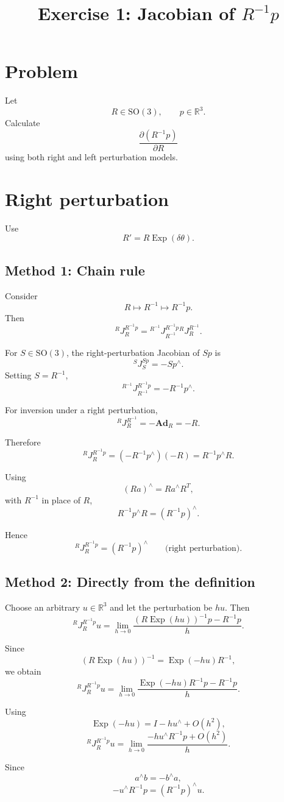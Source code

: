 \documentclass[11pt]{article}
\title{Exercise 1: Jacobian of $R^{-1}p$}
\author{}
\date{}
\newcommand{\Exp}{\operatorname{Exp}}
\newcommand{\SO}{\mathrm{SO}}
\newcommand{\Ad}{\mathbf{Ad}}
\newcommand{\R}{\mathbb{R}}
\begin{document}
\section*{Problem}
Let
\[
R\in\SO(3),\qquad p\in\R^3.
\]
Calculate
\[
\boxed{\frac{\partial(R^{-1}p)}{\partial R}}
\]
using both right and left perturbation models.
\section{Right perturbation}

Use
\[
R'=R\Exp(\delta\theta).
\]

\subsection{Method 1: Chain rule}

Consider
\[
R\longmapsto R^{-1}\longmapsto R^{-1}p.
\]
Then
\[
{}^{R}J_R^{R^{-1}p}
=
{}^{R^{-1}}J_{R^{-1}}^{R^{-1}p}{}^{R}J_R^{R^{-1}}.
\]

For $S\in\SO(3)$, the right-perturbation Jacobian of $Sp$ is
\[
{}^{S}J_S^{Sp}=-Sp^\wedge.
\]
Setting $S=R^{-1}$,
\[
{}^{R^{-1}}J_{R^{-1}}^{R^{-1}p}=-R^{-1}p^\wedge.
\]

For inversion under a right perturbation,
\[
{}^{R}J_R^{R^{-1}}=-\Ad_R=-R.
\]

Therefore
\[
{}^{R}J_R^{R^{-1}p}
=(-R^{-1}p^\wedge)(-R)
=R^{-1}p^\wedge R.
\]

Using
\[
(Ra)^\wedge=Ra^\wedge R^T,
\]
with $R^{-1}$ in place of $R$,
\[
R^{-1}p^\wedge R=(R^{-1}p)^\wedge.
\]

Hence
\[
\boxed{
{}^{R}J_R^{R^{-1}p}=(R^{-1}p)^\wedge
\qquad\text{(right perturbation)}.
}
\]

\subsection{Method 2: Directly from the definition}

Choose an arbitrary $u\in\R^3$ and let the perturbation be $hu$.
Then
\[
{}^{R}J_R^{R^{-1}p}u
=
\lim_{h\to0}
\frac{
(R\Exp(hu))^{-1}p-R^{-1}p
}{h}.
\]

Since
\[
(R\Exp(hu))^{-1}
=
\Exp(-hu)R^{-1},
\]
we obtain
\[
{}^{R}J_R^{R^{-1}p}u
=
\lim_{h\to0}
\frac{
\Exp(-hu)R^{-1}p-R^{-1}p
}{h}.
\]

Using
\[
\Exp(-hu)=I-hu^\wedge+O(h^2),
\]
\[
{}^{R}J_R^{R^{-1}p}u
=
\lim_{h\to0}
\frac{
-hu^\wedge R^{-1}p+O(h^2)
}{h}.
\]

Since
\[
a^\wedge b=-b^\wedge a,
\]
\[
-u^\wedge R^{-1}p=(R^{-1}p)^\wedge u.
\]
\end{document}
